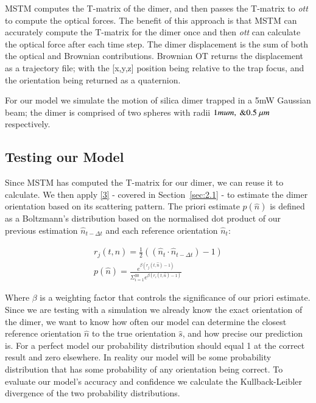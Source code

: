 \documentclass[preprint,3p]{elsarticle}
\begin{document}
MSTM computes the T-matrix of the dimer, and then passes the T-matrix to \textit{ott} to compute the optical forces. The benefit of this approach is that MSTM can accurately compute the T-matrix for the dimer once and then \textit{ott} can calculate the optical force after each time step. The dimer displacement is the sum of both the optical and Brownian contributions. Brownian OT returns the displacement as a trajectory file; with the [x,y,z] position being relative to the trap focus, and the orientation being returned as a quaternion. 

For our model we simulate the motion of silica dimer trapped in a 5mW Gaussian beam; the dimer is comprised of two spheres with radii $1\\mu m, \ \& 0.5 \ \mu m$ respectively.  

\subsection{Testing our Model}
\label{sec:2.2}

Since MSTM has computed the T-matrix for our dimer, we can reuse it to calculate. We then apply \eqref{3} - covered in Section~\ref{sec:2.1} - to estimate the dimer orientation based on its scattering pattern. The priori estimate $p(\hat{n})$ is defined as a Boltzmann's distribution based on the normalised dot product of our previous estimation $\hat{n}_{t-\Delta t}$ and each reference orientation $\hat{n}_t$:

\begin{align}
	r_j(t, \hat{n})= \frac{1}{2}((\hat{n}_{t} \cdot \hat{n}_{t-\Delta t})-1) \\
	p(\hat{n})= \frac{e^{\beta (r_j(t,\hat{n})-1)}}
	{\Sigma_{i=1}^{30}e^{\beta(r_i(t, \hat{n})-1)}}
\end{align}

Where $\beta$ is a weighting factor that controls the significance of our priori estimate. Since we are testing with a simulation we already know the exact orientation of the dimer, we want to know how often our model can determine the closest reference orientation $\hat{n}$ to the true orientation $\hat{s}$, and how precise our prediction is. For a perfect model our probability distribution should equal 1 at the correct result and zero elsewhere. In reality our model will be some probability distribution that has some probability of any orientation being correct. To evaluate our model's accuracy and confidence we calculate the Kullback-Leibler divergence of the two probability distributions. 
\end{document}
